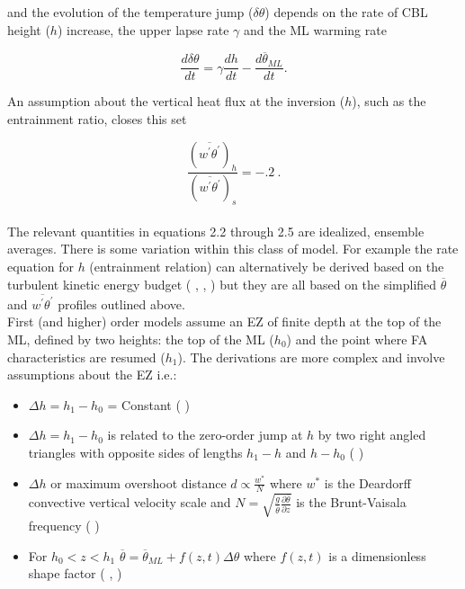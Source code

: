 and the evolution of the temperature jump ($\delta \theta$) depends on the rate of \acs{CBL} height ($h$) increase, the upper lapse rate $\gamma$ and the \acs{ML} warming rate
  
\begin{equation}
\frac{d\delta \theta}{dt} = \gamma\frac{dh}{dt} - \frac{d\overline{\theta}_{ML}}{dt}.
\end{equation}

An assumption about the vertical heat flux at the inversion ($h$), such as the entrainment ratio, closes this set

\begin{equation}
\frac{(\overline{w^{'}\theta^{'}})_{h}}{(\overline{w^{'}\theta^{'}})_{s}} = -.2 \ .
\end{equation}\\

The relevant quantities in equations 2.2 through 2.5 are idealized, ensemble averages. There is some variation within this class of model.  For example the rate equation for $h$ (entrainment relation) can alternatively be derived based on the turbulent kinetic energy budget (\citeauthor{FedConzMir04} \citeyear{FedConzMir04}, \citeauthor{Stull76a} \citeyear{Stull76a}, \citeauthor{Stull76b} \citeyear{Stull76b}) but they are all based on the simplified $\overline{\theta}$ and $\overline{w^{'}\theta^{'}}$ profiles outlined above.\\  

First (and higher) order models assume an \acs{EZ} of finite depth at the top of the ML, defined by two heights:  the top of the ML ($h_{0}$) and the point where \acs{FA} characteristics are resumed ($h_{1}$).  The derivations are more complex and involve assumptions about the \acs{EZ} i.e.: 

\begin{itemize}
\item{$\Delta h = h_{1} - h_{0}$ = Constant (\citeauthor{Betts74} \citeyear{Betts74})}

\item{$\Delta h = h_{1} - h_{0}$ is related to the zero-order jump at $h$ by two right angled triangles with opposite sides
of lengths $h_{1} - h$ and $h - h_{0}$ (\citeauthor{BatchGryn} \citeyear{BatchGryn})}

\item{$\Delta h$ or maximum overshoot distance $d \propto \frac{w^{*}}{N}$ where $w^{*}$ is the Deardorff convective vertical velocity scale and $N = \sqrt{\frac{g}{\overline{\theta}} \frac{\partial \overline{\theta}}{\partial z}}$ is the Brunt-Vaisala frequency (\citeauthor{Stull73} \citeyear{Stull73})}
 
\item{For $h_{0}<z<h_{1}$ $\overline{\theta} = \overline{\theta}_{ML} + f(z,t) \Delta \theta$ where $f(z,t)$ is a dimensionless shape factor (\citeauthor{Deardorff79} \citeyear{Deardorff79}, \citeauthor{FedConzMir04} \citeyear{FedConzMir04})}
\end{itemize}
 \\

